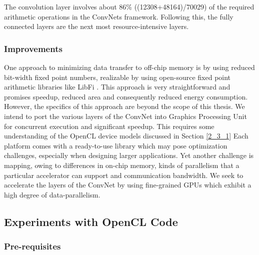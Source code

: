 The convolution layer involves about 86\% ((12308+48164)/70029) of the required arithmetic operations in the ConvNets framework. Following this, the fully connected layers are the next most resource-intensive layers. 
\subsubsection{Improvements}
\label{4_1_2_3}
One approach to minimizing data transfer to off-chip memory is by using reduced bit-width fixed point numbers, realizable by using open-source fixed point arithmetic libraries like LibFi \cite{LibFi}. This approach is very straightforward and promises speedup, reduced area and consequently reduced energy consumption. However, the specifics of this approach are beyond the scope of this thesis. \newline \newline
We intend to port the various layers of the ConvNet into Graphics Processing Unit for concurrent execution and significant speedup. This requires some understanding of the OpenCL device models discussed in Section \ref{2_3_1}
Each platform comes with a ready-to-use library which may pose optimization challenges, especially when designing larger applications.  Yet another challenge is mapping, owing to differences in on-chip memory, kinds of parallelism that a particular accelerator can support and communication bandwidth. We seek to accelerate the layers of the ConvNet by using fine-grained GPUs which exhibit a high degree of data-parallelism.
\subsection{Experiments with OpenCL Code}
\label{4_1_3}
\subsubsection{Pre-requisites}
\label{4_1_3_1}
